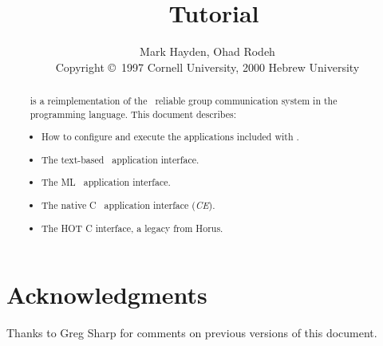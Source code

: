 \documentclass[11pt]{article}
\title{\ensemble\ Tutorial}
\author{Mark Hayden, Ohad Rodeh \\
\small{Copyright \copyright\ 1997 Cornell University,
                             2000 Hebrew  University}
}
\begin{document}
\maketitle

\begin{abstract}
\ensemble\ is a reimplementation of the \horus\ reliable group communication
system in the \caml\ programming language.  This document describes:
\begin{itemize}
\item
How to configure and execute the applications included with \ensemble.
\item
The text-based \ensemble\ application interface.
\item
The ML \ensemble\ application interface.
\item
The native C \ensemble\ application interface ({\it CE}).
\item 
The HOT C interface, a legacy from Horus.
\end{itemize}
\end{abstract}

\newpage
\tableofcontents
\newpage















\section*{Acknowledgments}
Thanks to Greg Sharp for comments on previous versions of this document.
\end{document}
